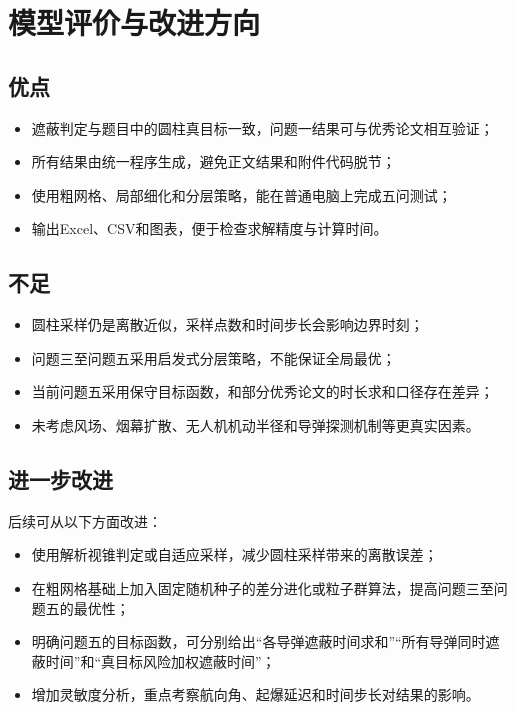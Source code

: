 \documentclass[12pt,a4paper]{article}
\begin{document}
\section{模型评价与改进方向}

\subsection{优点}

\begin{itemize}
\item 遮蔽判定与题目中的圆柱真目标一致，问题一结果可与优秀论文相互验证；
\item 所有结果由统一程序生成，避免正文结果和附件代码脱节；
\item 使用粗网格、局部细化和分层策略，能在普通电脑上完成五问测试；
\item 输出Excel、CSV和图表，便于检查求解精度与计算时间。
\end{itemize}

\subsection{不足}

\begin{itemize}
\item 圆柱采样仍是离散近似，采样点数和时间步长会影响边界时刻；
\item 问题三至问题五采用启发式分层策略，不能保证全局最优；
\item 当前问题五采用保守目标函数，和部分优秀论文的时长求和口径存在差异；
\item 未考虑风场、烟幕扩散、无人机机动半径和导弹探测机制等更真实因素。
\end{itemize}

\subsection{进一步改进}

后续可从以下方面改进：
\begin{itemize}
\item 使用解析视锥判定或自适应采样，减少圆柱采样带来的离散误差；
\item 在粗网格基础上加入固定随机种子的差分进化或粒子群算法，提高问题三至问题五的最优性；
\item 明确问题五的目标函数，可分别给出“各导弹遮蔽时间求和”“所有导弹同时遮蔽时间”和“真目标风险加权遮蔽时间”；
\item 增加灵敏度分析，重点考察航向角、起爆延迟和时间步长对结果的影响。
\end{itemize}
\end{document}
